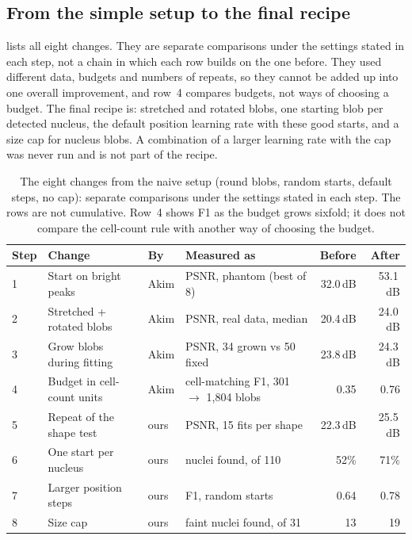 \documentclass[
  paper=a4,
  fontsize=11pt,
  english,
  numbers=noenddot,
  parskip=half,
  cdgeometry=symmetric,
  cd=barcolor,
  cdfont=false
]{tudscrartcl}
\begin{document}
\subsection{From the simple setup to the final recipe}

 lists all eight changes. They are separate comparisons under the settings
stated in each step, not a chain in which each row builds on the one before. They used
different data, budgets and numbers of repeats, so they cannot be added up into one overall
improvement, and row~4 compares budgets, not ways of choosing a budget. The final recipe is: stretched and rotated
blobs, one starting blob per detected nucleus, the default position learning rate with these
good starts, and a size cap for nucleus blobs. A combination of a larger learning rate with the
cap was never run and is not part of the recipe.

\begin{table}[tb]
  \centering\small
  \begin{tabular}{@{}llllrr@{}}
    \toprule
    Step & Change & By & Measured as & Before & After \\
    \midrule
    1 & Start on bright peaks & Akim & PSNR, phantom (best of 8) & 32.0\,dB & 53.1\,dB \\
    2 & Stretched + rotated blobs & Akim & PSNR, real data, median & 20.4\,dB & 24.0\,dB \\
    3 & Grow blobs during fitting & Akim & PSNR, 34 grown vs 50 fixed & 23.8\,dB & 24.3\,dB \\
    4 & Budget in cell-count units & Akim & cell-matching F1, 301 $\to$ 1{,}804 blobs & 0.35 & 0.76 \\
    5 & Repeat of the shape test & ours & PSNR, 15 fits per shape & 22.3\,dB & 25.5\,dB \\
    6 & One start per nucleus & ours & nuclei found, of 110 & 52\% & 71\% \\
    7 & Larger position steps & ours & F1, random starts & 0.64 & 0.78 \\
    8 & Size cap & ours & faint nuclei found, of 31 & 13 & 19 \\
    \bottomrule
  \end{tabular}
  \caption{The eight changes from the naive setup (round blobs, random starts, default steps,
  no cap): separate comparisons under the settings stated in each step. The rows are not
  cumulative. Row~4 shows F1 as the budget grows sixfold; it does not compare the cell-count rule
  with another way of choosing the budget.}
  \label{tab:recipe}
\end{table}
\end{document}
